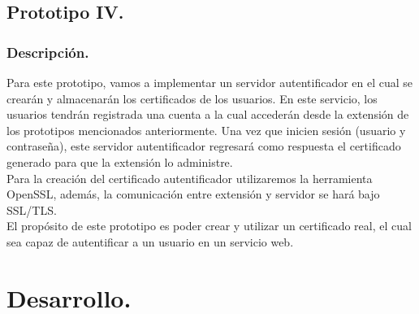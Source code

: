 \documentclass[12pt, a4paper, titlepage]{report}
\begin{document}
	    \section{Prototipo IV.}
	        \subsection{Descripción.}
	        
	        Para este prototipo, vamos a implementar un servidor autentificador en el cual se crearán y almacenarán los certificados de los usuarios. En este servicio, los usuarios tendrán registrada una cuenta a la cual accederán desde la extensión de los prototipos mencionados anteriormente. Una vez que inicien sesión (usuario y contraseña), este servidor autentificador regresará como respuesta el certificado generado para que la extensión lo administre.\\
	        Para la creación del certificado autentificador utilizaremos la herramienta OpenSSL, además, la comunicación entre extensión y servidor se hará bajo SSL/TLS.\\
	        El propósito de este prototipo es poder crear y utilizar un certificado real, el cual sea capaz de autentificar a un usuario en un servicio web.
	        
	            
	        
	        
	        
	        
	    
	\chapter{\textcolor{azulescom}{Desarrollo.}}
\end{document}
